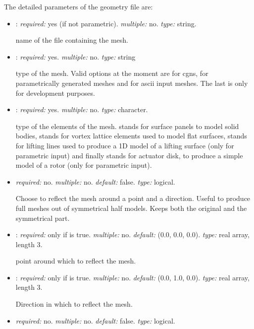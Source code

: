 The detailed parameters of the geometry file are:
\begin{itemize}
\item {}: \textit{required:} yes (if not parametric). \textit{multiple:} no. \textit{type:} string. 

name of the file containing the mesh.

\item {}: \textit{required:} yes. \textit{multiple:} no. \textit{type:} string

type of the mesh. Valid options at the moment are  for cgns,  for parametrically generated meshes and  for ascii input meshes. The last is only for development purposes. 

\item {}: \textit{required:} yes. \textit{multiple:} no. \textit{type:} character.

type of the elements of the mesh.  stands for surface panels to model solid bodies,  stands for vortex lattice elements used to model flat surfaces,  stands for lifting lines used to produce a 1D model of a lifting surface (only for parametric input) and finally  stands for actuator disk, to produce a simple model of a rotor (only for parametric input). 

\item {} \textit{required:} no. \textit{multiple:} no. \textit{default:} false. \textit{type:} logical.

Choose to reflect the mesh around a point and a direction. Useful to produce full meshes out of symmetrical half models. Keeps both the original and the symmetrical part. 

\item {}: \textit{required:} only if  is true. \textit{multiple:} no. \textit{default:} (0.0, 0.0, 0.0). \textit{type:} real array, length 3.

point around which to reflect the mesh.

\item {}: \textit{required:} only if  is true. \textit{multiple:} no. \textit{default:} (0.0, 1.0, 0.0). \textit{type:} real array, length 3.

Direction in which to reflect the mesh.

\item {} \textit{required:} no. \textit{multiple:} no. \textit{default:} false. \textit{type:} logical.


\end{itemize}
